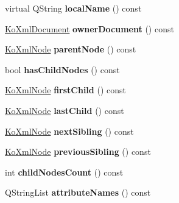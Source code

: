 \begin{CompactItemize}
\item 
\hypertarget{classKoXmlNode_12a19b317412059a47df882f6e66c6af}{
virtual QString \textbf{localName} () const }
\label{classKoXmlNode_12a19b317412059a47df882f6e66c6af}

\item 
\hypertarget{classKoXmlNode_5e7fa60afab968f744a5424da70699e4}{
\hyperlink{classKoXmlDocument}{KoXmlDocument} \textbf{ownerDocument} () const }
\label{classKoXmlNode_5e7fa60afab968f744a5424da70699e4}

\item 
\hypertarget{classKoXmlNode_50fb2d47e886a098fb369009939d08ad}{
\hyperlink{classKoXmlNode}{KoXmlNode} \textbf{parentNode} () const }
\label{classKoXmlNode_50fb2d47e886a098fb369009939d08ad}

\item 
\hypertarget{classKoXmlNode_caa00c62da8540db16ecbd54b953a1fc}{
bool \textbf{hasChildNodes} () const }
\label{classKoXmlNode_caa00c62da8540db16ecbd54b953a1fc}

\item 
\hypertarget{classKoXmlNode_144685aade56a4ba964452de8fa6e6e4}{
\hyperlink{classKoXmlNode}{KoXmlNode} \textbf{firstChild} () const }
\label{classKoXmlNode_144685aade56a4ba964452de8fa6e6e4}

\item 
\hypertarget{classKoXmlNode_ea16e2bca4f13dc87872a6f5a39647b7}{
\hyperlink{classKoXmlNode}{KoXmlNode} \textbf{lastChild} () const }
\label{classKoXmlNode_ea16e2bca4f13dc87872a6f5a39647b7}

\item 
\hypertarget{classKoXmlNode_422d7bd0d5107a2e062a22ddccf0220a}{
\hyperlink{classKoXmlNode}{KoXmlNode} \textbf{nextSibling} () const }
\label{classKoXmlNode_422d7bd0d5107a2e062a22ddccf0220a}

\item 
\hypertarget{classKoXmlNode_48e2e9b58a3a67307e6950476cb6dde5}{
\hyperlink{classKoXmlNode}{KoXmlNode} \textbf{previousSibling} () const }
\label{classKoXmlNode_48e2e9b58a3a67307e6950476cb6dde5}

\item 
\hypertarget{classKoXmlNode_fa7807761c17f1c4c49fae6d4702a3c6}{
int \textbf{childNodesCount} () const }
\label{classKoXmlNode_fa7807761c17f1c4c49fae6d4702a3c6}

\item 
\hypertarget{classKoXmlNode_4cbefc4c323ee9b422b568a141463feb}{
QStringList \textbf{attributeNames} () const }
\label{classKoXmlNode_4cbefc4c323ee9b422b568a141463feb}


\end{CompactItemize}
